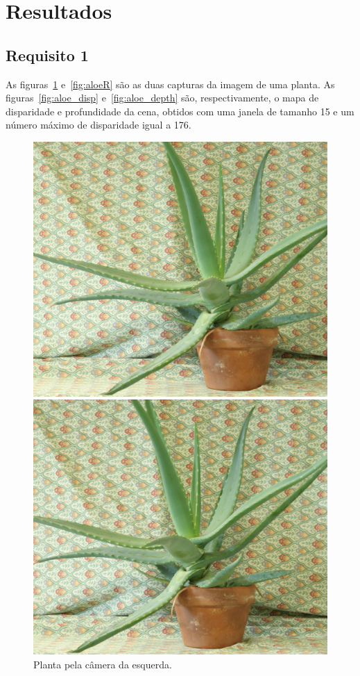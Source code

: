 \documentclass{bmvc2k}
\begin{document}
\section{Resultados}
\label{sec:res}
\subsection{Requisito 1}
As figuras~\ref{fig:aloeL} e~\ref{fig:aloeR} são as duas capturas da imagem de uma planta. As figuras~\ref{fig:aloe_disp} e~\ref{fig:aloe_depth} são, respectivamente, o mapa de disparidade e profundidade da cena, obtidos com uma janela de tamanho 15 e um número máximo de disparidade igual a 176.

\begin{figure}[htb]
\centering
\begin{minipage}[t]{0.2\textwidth}
  \centering
  \includegraphics[width=\linewidth]{figs/aloeL.png}
  \caption{Planta pela câmera da esquerda.}
  \label{fig:aloeL}
\end{minipage}\hfill
\begin{minipage}[t]{0.2\textwidth}
  \centering
  \includegraphics[width=\linewidth]{figs/aloeR.png}

\end{minipage}
\end{figure}
\end{document}
